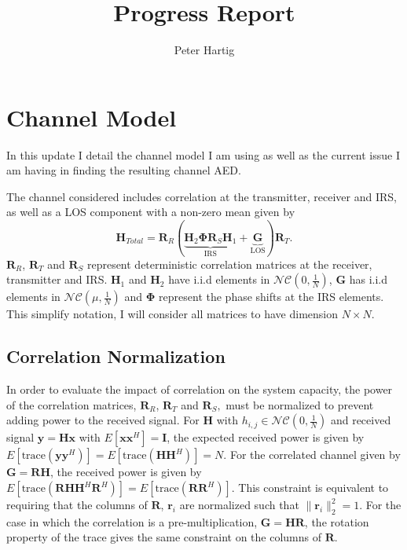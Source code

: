 \documentclass[12pt,a4paper]{report}
\title{Progress Report}
\author{Peter Hartig}
\begin{document}
\maketitle
\tableofcontents

\section{Channel Model}\label{section:channel}
In this update I detail the channel model I am using as well as the current issue I am having in finding the resulting channel AED. 
\par
The channel considered includes correlation at the transmitter, receiver and IRS, as well as a LOS component with a non-zero mean given by 
	\begin{equation}
	\mathbf{H}_{Total} = \mathbf{R}_{R}(\underbrace{\mathbf{H}_{2}\boldsymbol{\Phi}\mathbf{R}_{S}\mathbf{H}_{1}}_{\text{IRS}} + \underbrace{\mathbf{G}}_{\text{LOS}})\mathbf{R}_{T}.
	\end{equation}
	 $\mathbf{R}_{R}$, $\mathbf{R}_{T}$ and $\mathbf{R}_{S}$ represent deterministic correlation matrices at the receiver, transmitter and IRS. $\mathbf{H}_{1}$ and $\mathbf{H}_{2}$ have i.i.d elements in $\mathcal{NC}(0,\frac{1}{N})$, $\mathbf{G}$ has i.i.d elements in $\mathcal{NC}(\mu,\frac{1}{N})$ and $\boldsymbol{\Phi}$ represent the phase shifts at the IRS elements.
	This simplify notation, I will consider all matrices to have dimension $N \times N$. 

\subsection{Correlation Normalization}

In order to evaluate the impact of correlation on the system capacity, the power of the correlation matrices, $\mathbf{R}_{R}$, $\mathbf{R}_{T}$ and $\mathbf{R}_{S},$ must be normalized to prevent adding power to the received signal. For $\mathbf{H}$ with $h_{i,j} \in \mathcal{NC}(0,\frac{1}{N})$ and received signal $\mathbf{y} = \mathbf{H} \mathbf{x}$ with $E[\mathbf{x}\mathbf{x}^H] = \mathbf{I}$, the expected received power is given by 
$E[\text{trace}\left( \mathbf{y} \mathbf{y}^H \right) ]= E[\text{trace}\left(\mathbf{H} \mathbf{H}^H \right)] = N$.
For the correlated channel given by $\mathbf{G} = \mathbf{R}\mathbf{H}$, the received power is given by $E[\text{trace}\left(\mathbf{R} \mathbf{H} \mathbf{H}^H \mathbf{R}^H\right)] = E[\text{trace}\left(\mathbf{R}\mathbf{R}^H\right)] $. This constraint is equivalent to requiring that the columns of $\mathbf{R}$, $\mathbf{r}_i$ are normalized such that $\|\mathbf{r}_i\|^2_2 =1$. 
 For the case in which the correlation is a pre-multiplication, $\mathbf{G} = \mathbf{H}\mathbf{R}$, the rotation property of the trace gives the same constraint on the columns of 
 $\mathbf{R}$.
 
\end{document}
